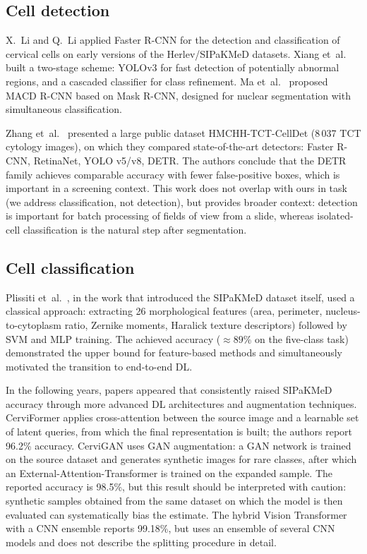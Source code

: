 \documentclass[14pt,a4paper]{extreport}
\begin{document}
\subsection{Cell detection}

X.~Li and Q.~Li \cite{li2019detection} applied Faster R-CNN for the
detection and classification of cervical cells on early versions of the
Herlev/SIPaKMeD datasets. Xiang et~al.\ \cite{xiang2020novel} built a
two-stage scheme: YOLOv3 for fast detection of potentially abnormal
regions, and a cascaded classifier for class refinement. Ma et~al.\
\cite{ma2020macd} proposed MACD R-CNN based on Mask R-CNN, designed for
nuclear segmentation with simultaneous classification.

Zhang et~al.\ \cite{zhang2025large} presented a large public dataset
HMCHH-TCT-CellDet (8\,037 TCT cytology images), on which they compared
state-of-the-art detectors: Faster R-CNN, RetinaNet, YOLO v5/v8, DETR.
The authors conclude that the DETR family achieves comparable accuracy
with fewer false-positive boxes, which is important in a screening
context. This work does not overlap with ours in task (we address
classification, not detection), but provides broader context: detection
is important for batch processing of fields of view from a slide,
whereas isolated-cell classification is the natural step after
segmentation.

\subsection{Cell classification}

Plissiti et~al.\ \cite{plissiti2018sipakmed}, in the work that
introduced the SIPaKMeD dataset itself, used a classical approach:
extracting 26 morphological features (area, perimeter,
nucleus-to-cytoplasm ratio, Zernike moments, Haralick texture
descriptors) followed by SVM and MLP training. The achieved accuracy
($\approx 89$\% on the five-class task) demonstrated the upper bound for
feature-based methods and simultaneously motivated the transition to
end-to-end DL.

In the following years, papers appeared that consistently raised
SIPaKMeD accuracy through more advanced DL architectures and
augmentation techniques. CerviFormer \cite{cerviformer2023} applies
cross-attention between the source image and a learnable set of latent
queries, from which the final representation is built; the authors
report 96.2\% accuracy. CerviGAN \cite{cervigan2025} uses GAN
augmentation: a GAN network is trained on the source dataset and
generates synthetic images for rare classes, after which an
External-Attention-Transformer is trained on the expanded sample. The
reported accuracy is 98.5\%, but this result should be interpreted with
caution: synthetic samples obtained from the same dataset on which the
model is then evaluated can systematically bias the estimate. The hybrid
Vision Transformer with a CNN ensemble \cite{hybridvit2025} reports
99.18\%, but uses an ensemble of several CNN models and does not
describe the splitting procedure in detail.
\end{document}
